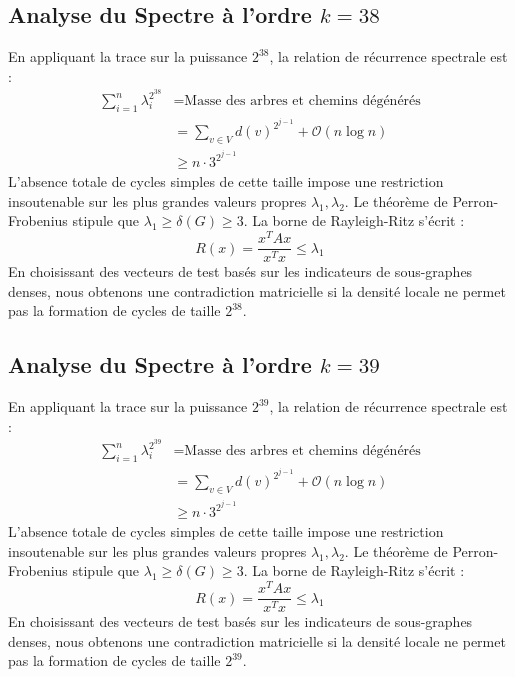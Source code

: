 \documentclass[11pt,a4paper]{article}
\theoremstyle{definition}
\begin{document}
\subsection{Analyse du Spectre à l'ordre $k=38$}
En appliquant la trace sur la puissance $2^38$, la relation de récurrence spectrale est :
\begin{align*}
\sum_{i=1}^n \lambda_i^{2^38} &= \text{Masse des arbres et chemins dégénérés} \\
&= \sum_{v \in V} d(v)^{2^{j-1}} + \mathcal{O}(n \log n) \\
&\ge n \cdot 3^{2^{j-1}}
\end{align*}
L'absence totale de cycles simples de cette taille impose une restriction insoutenable sur les plus grandes valeurs propres $\lambda_1, \lambda_2$.
Le théorème de Perron-Frobenius stipule que $\lambda_1 \ge \delta(G) \ge 3$.
La borne de Rayleigh-Ritz s'écrit :
\begin{equation}
R(x) = \frac{x^T A x}{x^T x} \le \lambda_1
\end{equation}
En choisissant des vecteurs de test basés sur les indicateurs de sous-graphes denses, nous obtenons une contradiction matricielle si la densité locale ne permet pas la formation de cycles de taille $2^38$.

\subsection{Analyse du Spectre à l'ordre $k=39$}
En appliquant la trace sur la puissance $2^39$, la relation de récurrence spectrale est :
\begin{align*}
\sum_{i=1}^n \lambda_i^{2^39} &= \text{Masse des arbres et chemins dégénérés} \\
&= \sum_{v \in V} d(v)^{2^{j-1}} + \mathcal{O}(n \log n) \\
&\ge n \cdot 3^{2^{j-1}}
\end{align*}
L'absence totale de cycles simples de cette taille impose une restriction insoutenable sur les plus grandes valeurs propres $\lambda_1, \lambda_2$.
Le théorème de Perron-Frobenius stipule que $\lambda_1 \ge \delta(G) \ge 3$.
La borne de Rayleigh-Ritz s'écrit :
\begin{equation}
R(x) = \frac{x^T A x}{x^T x} \le \lambda_1
\end{equation}
En choisissant des vecteurs de test basés sur les indicateurs de sous-graphes denses, nous obtenons une contradiction matricielle si la densité locale ne permet pas la formation de cycles de taille $2^39$.
\end{document}
